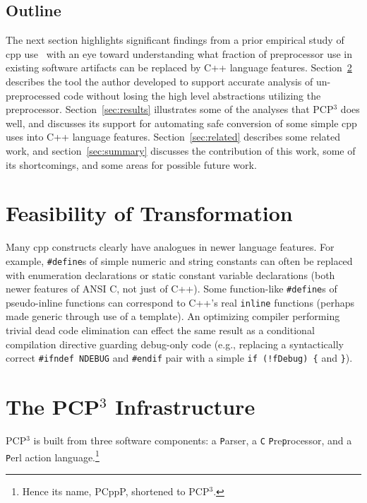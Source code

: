 \documentclass{article}
\newcommand{\pcp}{\mbox{\textsf{PCP}$^3$}}
\newcommand{\pcppp}{\mbox{\textsf{PCppP}}}
\newcommand{\Cpp}{\mbox{\textsf{cpp}}}
\newcommand{\CPP}{\mbox{\textsf{C++}}}
\newcommand{\C}{\mbox{\textsf{C}}}
\newcommand{\ppd}[1]{\texttt{\##1}}
\begin{document}
\subsection{Outline}

The next section highlights significant findings from a prior empirical
study of \Cpp{} use~\cite{EmpCpp-TR} with an eye toward understanding
what fraction of preprocessor use in existing software artifacts can be
replaced by \CPP{} language features.  Section~\ref{sec:pcp3} describes
the tool the author developed to support accurate analysis of
un-preprocessed code without losing the high level abstractions
utilizing the preprocessor. Section~\ref{sec:results} illustrates some
of the analyses that \pcp{} does well, and discusses its support for
automating safe conversion of some simple \Cpp{} uses into \CPP{} language
features. Section~\ref{sec:related} describes some related work, and
section~\ref{sec:summary} discusses the contribution of this work, some
of its shortcomings, and some areas for possible future work.


\section{Feasibility of Transformation}
\label{sec:feasibility}
Many \Cpp{} constructs clearly have analogues in newer language
features.  For example, \ppd{define}s of simple numeric and string
constants can often be replaced with enumeration declarations or static
constant variable declarations (both newer features of ANSI
\C{}, not just of \CPP{}).
Some function-like \ppd{define}s of pseudo-inline functions can
correspond to \CPP{}'s real \texttt{inline} functions (perhaps made
generic through use of a template).  An optimizing compiler performing
trivial dead code elimination can effect the same result as a
conditional compilation directive guarding debug-only code (e.g.,
replacing a syntactically correct \texttt{\ppd{ifndef} NDEBUG} and
\ppd{endif} pair with a simple \texttt{if (!fDebug) \{} and
\texttt{\}}).



\section{The \pcp{} Infrastructure}
\label{sec:pcp3}
\pcp{} is built from three software components: a \texttt{P}arser, a \texttt{C}
\texttt{P}re\texttt{p}rocessor, and a \texttt{P}erl action
language.\footnote{Hence its name, \pcppp{}, shortened to \pcp{}.}
\end{document}
